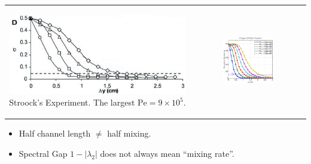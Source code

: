 \documentclass[12pt,t]{beamer}
\begin{document}
\begin{frame}
    \begin{center}
    \begin{tabular}{cc}  
       \begin{minipage}[b]{0.5\textwidth}
       \begin{center}
       \includegraphics[width=1\textwidth]{stroockexperiment}
       \tiny{Stroock's Experiment. The largest $\text{Pe} = 9\times 10^5$.} 
       \end{center}
       \end{minipage}\hfill&
       \includegraphics[width=0.47\textwidth]{example2veryPe2}      
    \end{tabular}
    \end{center}
 \begin{itemize}
       \item Half channel length $\neq$ half mixing.  
       \item Spectral Gap $1-|\lambda_2|$ does not always mean ``mixing rate''.       
 \end{itemize}
\end{frame}
\end{document}

